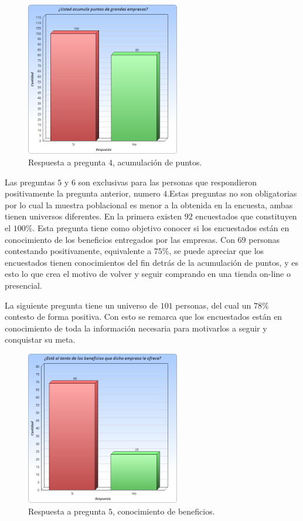 \begin{figure}[!htb]
  \centering
  \includegraphics[width=0.6\textwidth]{images/Graficos/graf_5_2.png}
  \caption[chart5.2]{Respuesta a pregunta $4$, acumulación de puntos.}
  \label{fig:chart5.2}
\end{figure}

Las preguntas $5$ y $6$ son exclusivas para las personas que respondieron positivamente la
pregunta anterior, numero $4$.Estas preguntas no son obligatorias por lo cual la muestra poblacional
es menor a la obtenida en la encuesta, ambas tienen universos diferentes.
En la primera existen $92$ encuestados que constituyen el $100\%$. Esta pregunta tiene como objetivo
conocer si los encuestados están en conocimiento de los beneficios entregados por las empresas.
Con $69$ personas contestando positivamente, equivalente a $75\%$, se puede apreciar que los
encuestados tienen conocimientos del fin detrás de la acumulación de puntos, y es esto lo que
crea el motivo de volver y seguir comprando en una tienda on-line o presencial.

La siguiente pregunta tiene un universo de $101$ personas, del cual un $78\%$ contesto de forma positiva.
Con esto se remarca que los encuestados están en conocimiento de toda la información necesaria
para motivarlos a seguir y conquistar su meta.

\begin{figure}[!htb]
  \centering
  \includegraphics[width=0.6\textwidth]{images/Graficos/graf_5_3.png}
  \caption[chart5.3]{Respuesta a pregunta $5$, conocimiento de beneficios.}
  \label{fig:chart5.3}
\end{figure}

